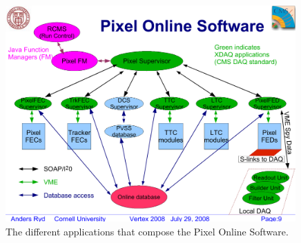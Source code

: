 \begin{figure}
\begin{center}
 \includegraphics[width=0.99\textwidth]{POScomponents.pdf}
\end{center}
\caption{The different applications that compose the Pixel Online Software.}
\label{fig:components}
\end{figure}

